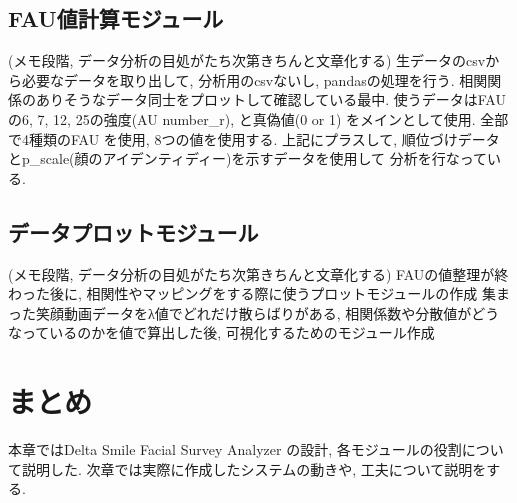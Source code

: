 \subsection{FAU値計算モジュール}
(メモ段階, データ分析の目処がたち次第きちんと文章化する)
生データのcsvから必要なデータを取り出して, 分析用のcsvないし, pandasの処理を行う.
相関関係のありそうなデータ同士をプロットして確認している最中.
使うデータはFAU の6, 7, 12, 25の強度(AU number\_r), と真偽値(0 or 1) をメインとして使用.
全部で4種類のFAU を使用, 8つの値を使用する.
上記にプラスして, 順位づけデータとp\_scale(顔のアイデンティディー)を示すデータを使用して
分析を行なっている.

\subsection{データプロットモジュール}
(メモ段階, データ分析の目処がたち次第きちんと文章化する)
FAUの値整理が終わった後に, 相関性やマッピングをする際に使うプロットモジュールの作成
集まった笑顔動画データをλ値でどれだけ散らばりがある, 相関係数や分散値がどうなっているのかを値で算出した後,
可視化するためのモジュール作成

\section{まとめ}
本章ではDelta Smile Facial Survey Analyzer の設計, 各モジュールの役割について説明した.
次章では実際に作成したシステムの動きや, 工夫について説明をする.
